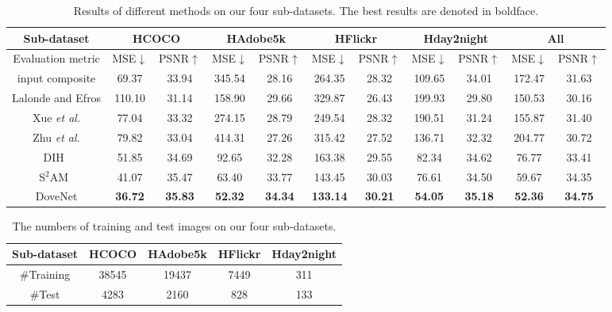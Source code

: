 \documentclass[10pt,twocolumn,letterpaper]{article}
\begin{document}
\setlength{\tabcolsep}{5pt}
\begin{table*}[tb]
\centering
\begin{tabular}{|l|c|c|c|c|c|c|c|c|c|c|}
\hline
\multicolumn{1}{|c|}{Sub-dataset} & \multicolumn{2}{c|}{HCOCO} & \multicolumn{2}{c|}{HAdobe5k} & \multicolumn{2}{c|}{HFlickr} & \multicolumn{2}{c|}{Hday2night} & \multicolumn{2}{c|}{All}\\ \hline
\multicolumn{1}{|c|}{Evaluation metric} & MSE$\downarrow$ & PSNR$\uparrow$ & MSE$\downarrow$ & PSNR$\uparrow$ & MSE$\downarrow$ & PSNR$\uparrow$ & MSE$\downarrow$ & PSNR$\uparrow$ & MSE$\downarrow$ & PSNR$\uparrow$ \\ \hline
\multicolumn{1}{|c|}{input composite} & 69.37 & 33.94 & 345.54 & 28.16 & 264.35 & 28.32 & 109.65 & 34.01 & 172.47 & 31.63 \\ \hline
\multicolumn{1}{|c|}{Lalonde and Efros\cite{lalonde2007using}} & 110.10 & 31.14 & 158.90 & 29.66 & 329.87 & 26.43 & 199.93 & 29.80 & 150.53 & 30.16 \\ \hline
\multicolumn{1}{|c|}{Xue \emph{et al.}\cite{xue2012understanding}} & 77.04 & 33.32 & 274.15 & 28.79 & 249.54 & 28.32 & 190.51 & 31.24 & 155.87 & 31.40 \\ \hline
\multicolumn{1}{|c|}{Zhu \emph{et al.}\cite{zhu2015learning}} & 79.82 & 33.04 & 414.31 & 27.26 & 315.42 & 27.52 & 136.71 & 32.32 & 204.77 & 30.72 \\ \hline
\multicolumn{1}{|c|}{DIH~\cite{tsai2017deep}} & 51.85 & 34.69 & 92.65 & 32.28 & 163.38 & 29.55 & 82.34 & 34.62 & 76.77 & 33.41 \\ \hline
\multicolumn{1}{|c|}{S$^2$AM~\cite{xiaodong2019improving}} & 41.07 & 35.47 & 63.40 & 33.77 & 143.45 & 30.03 & 76.61 & 34.50 & 59.67 & 34.35 \\ \hline
\multicolumn{1}{|c|}{DoveNet} & \bf36.72 & \bf35.83 & \bf52.32 & \bf34.34 & \bf133.14 & \bf30.21 & \bf54.05 & \bf35.18 & \bf52.36 & \bf34.75 \\ \hline
\end{tabular}
\caption{Results of different methods on our four sub-datasets. The best results are denoted in boldface.}
\label{tab:baselines}
\end{table*}


\setlength{\tabcolsep}{4pt}
\begin{table}
\centering
\begin{tabular}{|c|c|c|c|c|}
\hline
Sub-dataset & HCOCO & HAdobe5k & HFlickr & Hday2night\\
\hline
\#Training & 38545 & 19437 & 7449 & 311 \\
\hline
\#Test & 4283 & 2160 & 828 & 133 \\
\hline
\end{tabular}
\caption{The numbers of training and test images on our four sub-datasets.}
\label{tab:statistics}
\vspace{-12pt}
\end{table}
\end{document}
